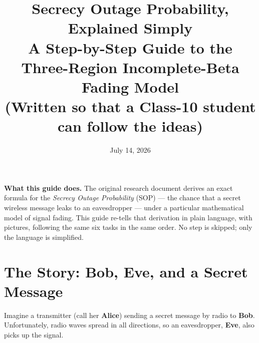 \documentclass[11pt]{article}
\title{\textbf{Secrecy Outage Probability, Explained Simply}\\[2mm]
\large A Step-by-Step Guide to the Three-Region Incomplete-Beta Fading Model\\
(Written so that a Class-10 student can follow the ideas)}
\author{}
\date{July 14, 2026}
\begin{document}
\maketitle
\vspace{-8mm}

\begin{center}
\begin{tcolorbox}[colback=softgray,colframe=black!40,width=0.92\textwidth]
\small \textbf{What this guide does.} The original research document derives an exact
formula for the \emph{Secrecy Outage Probability} (SOP) --- the chance that a secret
wireless message leaks to an eavesdropper --- under a particular mathematical model of
signal fading. This guide re-tells that derivation in plain language, with pictures,
following the same six tasks in the same order. No step is skipped; only the language
is simplified.
\end{tcolorbox}
\end{center}

\tableofcontents

\section{The Story: Bob, Eve, and a Secret Message}

Imagine a transmitter (call her \textbf{Alice}) sending a secret message by radio to
\textbf{Bob}. Unfortunately, radio waves spread in all directions, so an eavesdropper,
\textbf{Eve}, also picks up the signal.

\begin{center}
\end{center}
\end{document}
